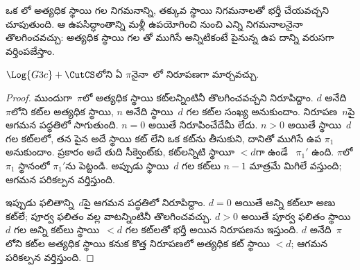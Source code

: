 \documentclass[../../../include/open-logic-section]{subfiles}
\begin{document}
 ఒక లో అత్యధిక స్థాయి గల \CutCS{} నిగమనాన్ని, తక్కువ స్థాయి \CutCS{} నిగమనాలతో భర్తీ చేయవచ్చని చూపుతుంది. ఆ ఉపసిద్ధాంతాన్ని మళ్లీ ఉపయోగించి  నుంచి ఎన్ని \CutCS{} నిగమనాలనైనా తొలగించవచ్చు: అత్యధిక స్థాయి గల \CutCS{}తో ముగిసే అన్నిటికంటే పైనున్న ఉప దాన్ని వరుసగా వర్తింపజేస్తాం.

\begin{thm}
$\Log{G3c} + \CutCS$లోని ఏ  $\pi$నైనా~లో నిరూపణగా మార్చవచ్చు.
\end{thm}

\begin{proof}
  ముందుగా~$\pi$లో అత్యధిక స్థాయి కట్‌లన్నింటినీ తొలగించవచ్చని నిరూపిద్దాం. $d$ అనేది~$\pi$లోని కట్‌ల అత్యధిక స్థాయి, $n$ అనేది స్థాయి~$d$ గల కట్‌ల సంఖ్య అనుకుందాం. నిరూపణ~$n$పై ఆగమన పద్ధతిలో సాగుతుంది. $n=0$ అయితే నిరూపించేదేమీ లేదు. $n>0$ అయితే స్థాయి~$d$ గల కట్‌లలో, తన పైన అదే స్థాయి కట్ లేని ఒక కట్‌ను తీసుకుని, దానితో ముగిసే ఉప $\pi_1$ అనుకుందాం.  ప్రకారం అదే తుది సీక్వెంట్‌కు, కట్‌లన్నిటి స్థాయీ $<d$గా ఉండే ~$\pi_1'$ ఉంది. $\pi$లో $\pi_1$ స్థానంలో $\pi_1'$ను పెట్టండి. అప్పుడు స్థాయి~$d$ గల కట్‌లు $n-1$ మాత్రమే మిగిలే  వస్తుంది; ఆగమన పరికల్పన వర్తిస్తుంది.

  ఇప్పుడు ఫలితాన్ని~$d$పై ఆగమన పద్ధతిలో నిరూపిద్దాం. $d=0$ అయితే అన్ని కట్‌లూ అణు కట్‌లే; పూర్వ ఫలితం వల్ల వాటన్నింటినీ తొలగించవచ్చు. $d>0$ అయితే పూర్వ ఫలితం స్థాయి $d$ గల అన్ని కట్‌లు స్థాయి~$<d$ గల కట్‌లతో భర్తీ అయిన నిరూపణను ఇస్తుంది. $d$ అనేది~$\pi$లోని కట్‌ల అత్యధిక స్థాయి కనుక కొత్త నిరూపణలో అత్యధిక కట్ స్థాయి $<d$; ఆగమన పరికల్పన వర్తిస్తుంది.
\end{proof}
\end{document}
